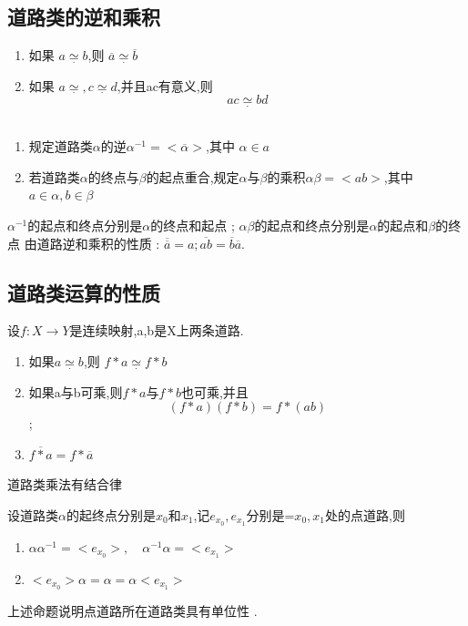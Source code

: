 \subsection*{道路类的逆和乘积}
\begin{corollary}
    \begin{enumerate}
        \item 如果 \(a \underset{.}{\simeq}b \),则 \(\overline{a} \underset{.}{\simeq} \overline{b}\) \\
        \item 如果 \(a \underset{.}{\simeq} , c\underset{.}{\simeq}d\),并且ac有意义,则 \[ac \underset{.}{\simeq} bd\] \\
    \end{enumerate}
\end{corollary}
\begin{definition}
    \begin{enumerate}
        \item 规定道路类\(\alpha\)的逆\(\alpha^{-1} = < \overline{\alpha}> \),其中 \(\alpha \in a \) \\
        \item 若道路类\(\alpha\)的终点与\(\beta\)的起点重合,规定\(\alpha\)与\(\beta\)的乘积\(\alpha\beta = <ab> \),其中 \(a \in \alpha ,b \in \beta\)
    \end{enumerate}
\end{definition}
\(\alpha^{-1}\)的起点和终点分别是\(\alpha\)的终点和起点 ; \(\alpha \beta\)的起点和终点分别是\(\alpha\)的起点和\(\beta\)的终点
由道路逆和乘积的性质 : \(\overline{\overline{a}}= a  ; \overline{ab}=\overline{b}\overline{a}\).
\subsection*{道路类运算的性质}
\begin{corollary}
    设\(f: X \rightarrow Y\)是连续映射,a,b是X上两条道路.
    \begin{enumerate}
        \item 如果\(a \underset{.}{\simeq} b \),则 \(f * a \underset{.}{\simeq} f* b \) \\
        \item 如果a与b可乘,则\(f*a\)与\(f*b\)也可乘,并且 \[(f*a)(f*b) = f*(ab)\] ; \\
        \item \(\overline{f*a} = f * \overline{a} \) 
    \end{enumerate}
\end{corollary}
\begin{corollary}
    道路类乘法有结合律
\end{corollary}
\begin{corollary}
    设道路类\(\alpha\)的起终点分别是\(x_0\)和\(x_1\),记\(e_{x_0}, e_{x_1}\)分别是=\(x_0 , x_1\)处的点道路,则
    \begin{enumerate}
        \item \(\alpha\alpha^{-1} = <e_{x_0}> , \quad \alpha^{-1}\alpha = <e_{x_1}> \) \\
        \item \(<e_{x_0}> \alpha = \alpha = \alpha <e_{x_1}>\)
    \end{enumerate}
\end{corollary}
上述命题说明点道路所在道路类具有单位性 .
